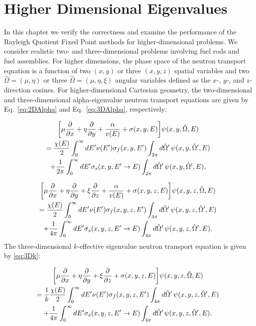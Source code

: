 \chapter{Higher Dimensional Eigenvalues}

In this chapter we verify the correctness and examine the performance of the Rayleigh Quotient Fixed Point methods for higher-dimensional problems. We consider realistic two- and three-dimensional problems involving fuel rods and fuel assemblies. For higher dimensions, the phase space of the neutron transport equation is a function of two $(x, y)$ or three $(x, y, z)$ spatial variables and two $\hat{\Omega} = (\mu, \eta)$ or three $\hat{\Omega} =  (\mu, \eta, \xi)$ angular variables defined as the $x$-, $y$-, and $z$-direction cosines. For higher-dimensional Cartesian geometry, the two-dimensional and three-dimensional alpha-eigenvalue neutron transport equations are given by Eq.~\ref{eq:2DAlpha} and Eq.~\ref{eq:3DAlpha}, respectively:

\begin{multline}
\bigg [ \mu \frac{\partial}{\partial x} + \eta \frac{\partial}{\partial y} + \frac{\alpha}{v(E)} + \sigma(x,y,E) \bigg ] \psi(x,y,\hat{\Omega},E) \\ = \frac{\chi(E)}{2} \int_{0}^{\infty} \mathop{}\!d E' \nu(E') \sigma_{f}(x,y,E') \int_{2\pi} \mathop{}\!d \hat{\Omega}' \, \psi(x,y, \hat{\Omega}', E) \\ + \frac{1}{2\pi} \int_{0}^{\infty} \mathop{}\!d E' \sigma_{s}(x, y, E' \rightarrow E) \int_{2\pi} \mathop{}\!d \hat{\Omega}' \, \psi(x,y, \hat{\Omega}',E),
\label{eq:2DAlpha}
\end{multline}

\begin{multline}
\bigg [ \mu \frac{\partial}{\partial x} + \eta \frac{\partial}{\partial y} + \xi \frac{\partial}{\partial z} + \frac{\alpha}{v(E)} + \sigma(x,y,z,E) \bigg ] \psi(x,y,z,\hat{\Omega}, E) \\ = \frac{\chi(E)}{2} \int_{0}^{\infty} \mathop{}\!d E' \nu(E') \sigma_{f}(x,y,z,E') \int_{4\pi} \mathop{}\!d \hat{\Omega}' \, \psi(x,y,z, \hat{\Omega}',E) \\ + \frac{1}{4\pi} \int_{0}^{\infty} \mathop{}\!d E' \sigma_{s}(x, y, z, E' \rightarrow E) \int_{4\pi} \mathop{}\!d \hat{\Omega}' \, \psi(x,y,z, \hat{\Omega}',E).
\label{eq:3DAlpha}
\end{multline}
The three-dimensional $k$-effective eigenvalue neutron transport equation is given by \ref{eq:3Dk}:

\begin{multline}
\bigg [ \mu \frac{\partial}{\partial x} + \eta \frac{\partial}{\partial y} + \xi \frac{\partial}{\partial z} + \sigma(x,y,z,E) \bigg ] \psi(x,y,z,\hat{\Omega}, E) \\ = \frac{1}{k}\frac{\chi(E)}{2} \int_{0}^{\infty} \mathop{}\!d E' \nu(E') \sigma_{f}(x,y,z,E') \int_{4\pi} \mathop{}\!d \hat{\Omega}' \, \psi(x,y,z, \hat{\Omega}',E) \\ + \frac{1}{4\pi} \int_{0}^{\infty} \mathop{}\!d E' \sigma_{s}(x, y, z, E' \rightarrow E) \int_{4\pi} \mathop{}\!d \hat{\Omega}' \, \psi(x,y,z, \hat{\Omega}',E).
\label{eq:3Dk}
\end{multline}


